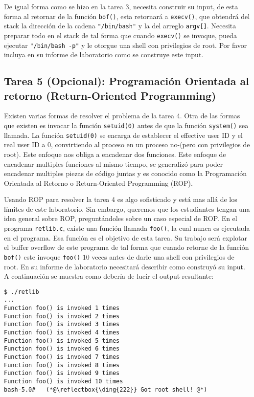 De igual forma como se hizo en la tarea 3, necesita construir su input, de esta forma al retornar de la función \texttt{bof()}, esta retornará a \texttt{execv()}, que obtendrá del stack la dirección de la cadena \texttt{"/bin/bash"} y la del arreglo \texttt{argv[]}. Necesita preparar todo en el stack de tal forma que cuando \texttt{execv()} se invoque, pueda ejecutar \texttt{"/bin/bash -p"} y le otorgue una shell con privilegios de root.
Por favor incluya en su informe de laboratorio como se construye este input.



\subsection{Tarea 5 (Opcional): Programación Orientada al retorno (Return-Oriented Programming)}

Existen varias formas de resolver el problema de la tarea 4. Otra de las formas que existen es invocar la función \texttt{setuid(0)} antes de que la función \texttt{system()} sea llamada. La función \texttt{setuid(0)} se encarga de establecer el effective user ID y el real user ID a 0, convirtiendo al proceso en un proceso no-\setuid (pero con privilegios de root). Este enfoque nos obliga a encadenar dos funciones. Este enfoque de encadenar multiples funciones al mismo tiempo, se generalizó para poder encadenar multiples piezas de código juntas y es conocido como la Programación Orientada al Retorno o Return-Oriented Programming (ROP).

Usando ROP para resolver la tarea 4 es algo sofisticado y está mas allá de los límites de este laboratorio. Sin embargo, queremos que los estudiantes tengan una idea general sobre ROP, preguntándoles sobre un caso especial de ROP.
En el programa \texttt{retlib.c}, existe una función llamada \texttt{foo()}, la cual nunca es ejecutada en el programa. Esa función es el objetivo de esta tarea. Su trabajo será explotar el buffer overflow de este programa de tal forma que cuando retorne de la función \texttt{bof()} este invoque \texttt{foo()} 10 veces antes de darle una shell con privilegios de root.
En su informe de laboratorio necesitará describir como construyó su input. A continuación se muestra como debería de lucir el output resultante:

\begin{lstlisting}
$ ./retlib
...
Function foo() is invoked 1 times
Function foo() is invoked 2 times
Function foo() is invoked 3 times
Function foo() is invoked 4 times
Function foo() is invoked 5 times
Function foo() is invoked 6 times
Function foo() is invoked 7 times
Function foo() is invoked 8 times
Function foo() is invoked 9 times
Function foo() is invoked 10 times
bash-5.0#   (*@\reflectbox{\ding{222}} Got root shell! @*)
\end{lstlisting}
 
